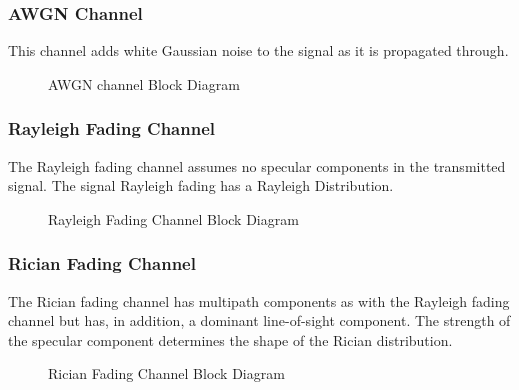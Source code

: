 \subsubsection{\gls{AWGN} Channel}
This channel adds white Gaussian noise to the signal as it is propagated through. 
\begin{figure}[htpb!]
	\centerline{\resizebox{15cm}{!}{}}
	\caption{\gls{AWGN} channel Block Diagram}
	\label{fig:ofdm_ch_awgn_meth}
\end{figure}

\subsubsection{Rayleigh Fading Channel}
The Rayleigh fading channel assumes no specular components in the transmitted signal. The signal Rayleigh fading has a Rayleigh Distribution.
\begin{figure}[htpb!]
	\centerline{\resizebox{15cm}{!}{}}
	\caption{Rayleigh Fading Channel Block Diagram}
	\label{fig:ofdm_ch_rayl_meth}
\end{figure}

\subsubsection{Rician Fading Channel}
The Rician fading channel has multipath components as with the Rayleigh fading channel but has, in addition, a dominant line-of-sight component. The strength of the specular component determines the shape of the Rician distribution. 
\begin{figure}[h!]
	\centerline{\resizebox{15cm}{!}{}}
	\caption{Rician Fading Channel Block Diagram}
	\label{fig:ofdm_ch_rice_meth}
\end{figure}


